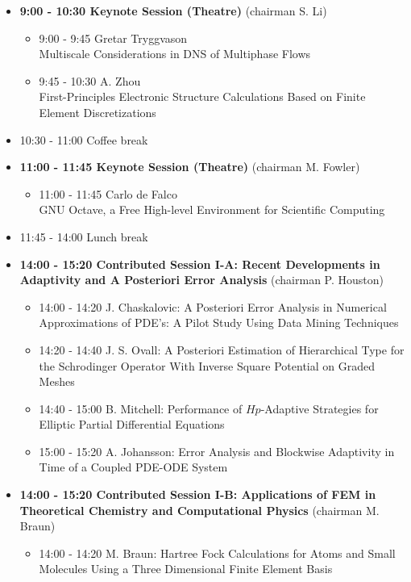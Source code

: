\documentclass[10pt, A4]{article}%
\begin{document}
\begin{itemize}    
  \item {\bf 9:00 - 10:30 Keynote Session (Theatre)} (chairman S. Li) 
  \begin{itemize}
    \item 9:00 - 9:45 {Gretar Tryggvason}\\{Multiscale Considerations in DNS of Multiphase Flows}
    \item 9:45 - 10:30 {A. Zhou}\\{First-Principles Electronic Structure Calculations Based on Finite Element Discretizations}
  \end{itemize}
  \item 10:30 - 11:00 Coffee break
  \item {\bf 11:00 - 11:45 Keynote Session (Theatre)} (chairman M. Fowler) 
  \begin{itemize}
    \item 11:00 - 11:45 {Carlo de Falco}\\{GNU Octave, a Free High-level Environment for Scientific Computing}
  \end{itemize}
  \item 11:45 - 14:00 Lunch break      
  \item {\bf 14:00 - 15:20 Contributed Session I-A: Recent Developments in Adaptivity and A Posteriori Error Analysis} (chairman P. Houston) 
  \begin{itemize}
    \item 14:00 - 14:20 {J. Chaskalovic}: {A Posteriori Error Analysis in Numerical Approximations of PDE's: A Pilot Study Using Data Mining Techniques} %
    \item 14:20 - 14:40 {J. S. Ovall}: {A Posteriori Estimation of Hierarchical Type for the  Schrodinger Operator With Inverse Square Potential on Graded Meshes}
    \item 14:40 - 15:00 {B. Mitchell}: {Performance of $Hp$-Adaptive Strategies for Elliptic Partial Differential Equations}
    \item 15:00 - 15:20 {A. Johansson}: {Error Analysis and Blockwise Adaptivity in Time of a Coupled PDE-ODE System} 
  \end{itemize}
  \item {\bf 14:00 - 15:20 Contributed Session I-B: Applications of FEM in Theoretical Chemistry and Computational Physics} (chairman M. Braun) 
  \begin{itemize}
    \item 14:00 - 14:20 {M. Braun}: {Hartree Fock Calculations for Atoms and Small Molecules Using  a Three Dimensional Finite Element Basis}

\end{itemize}
\end{itemize}
\end{document}
